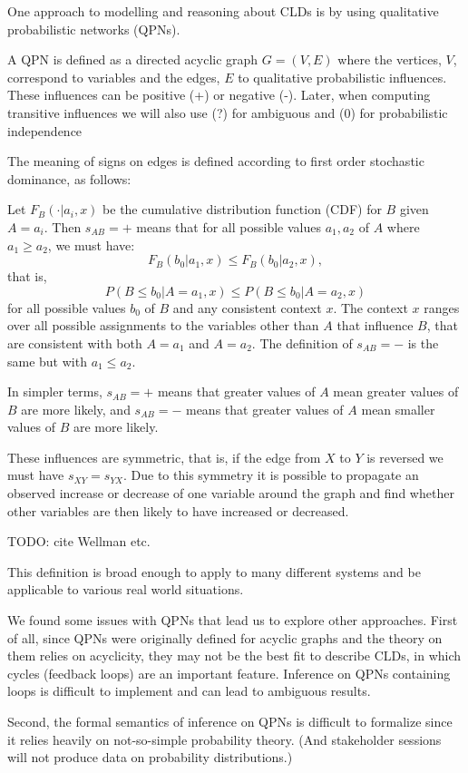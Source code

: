 One approach to modelling and reasoning about CLDs is by using qualitative
probabilistic networks (QPNs).

A QPN is defined as a directed
acyclic graph $G=(V,E)$ where the vertices, $V$, correspond to
variables and the edges, $E$ to qualitative probabilistic influences.
%
These influences can be positive (+) or negative (-).
%
Later, when computing transitive influences we will also use (?) for
ambiguous and (0) for probabilistic independence

The meaning of signs on edges is defined according to first order
stochastic dominance, as follows:

Let $F_B(\cdot|a_i, x)$ be the cumulative distribution function (CDF) for
$B$ given $A=a_i$. Then $s_{AB}=+$ means that for all possible values
$a_1,a_2$ of $A$ where $a_1\geq a_2$, we must have:
\[F_B(b_0|a_1, x)\leq F_B(b_0|a_2, x),\]
that is,
\[P(B \leq b_0| A = a_1, x)\leq P(B\leq b_0| A = a_2, x)\]
for all possible values $b_0$ of $B$ and any consistent context $x$.
The context $x$ ranges over all possible assignments to the
variables other than $A$ that influence $B$, that are consistent with both
$A=a_1$ and $A=a_2$.
%
The definition of $s_{AB}=-$ is the same but with $a_1\leq a_2$.

In simpler terms, $s_{AB} = +$ means that greater values of $A$ mean
greater values of $B$ are more likely, and $s_{AB}=-$ means that
greater values of $A$ mean smaller values of $B$ are more likely.

These influences are symmetric, that is, if the edge from $X$ to $Y$ is reversed
we must have $s_{XY} = s_{YX}$.
%
Due to this symmetry it is possible to propagate an observed increase
or decrease of one variable around the graph and find whether other
variables are then likely to have increased or decreased.

TODO: cite Wellman etc.

This definition is broad enough to
apply to many different systems and
be applicable to various real world situations.

We found some issues with QPNs that lead us to explore other
approaches.
%
First of all, since QPNs were originally defined for acyclic graphs
and the theory on them relies on acyclicity, they may not be the best
fit to describe CLDs, in which cycles (feedback loops) are an important
feature.
%
Inference on QPNs containing loops is difficult to implement and can
lead to ambiguous results.

Second, the formal semantics of inference on QPNs is difficult to
formalize since it relies heavily on not-so-simple probability theory.
%
(And stakeholder sessions will not produce data on probability
distributions.)

